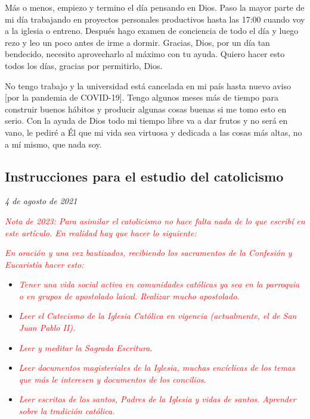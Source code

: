\documentclass[12pt]{article}
\begin{document}
Más o menos, empiezo y termino el día pensando en Dios. Paso la mayor parte de
mi día trabajando en proyectos personales productivos hasta las 17:00 cuando voy
a la iglesia o entreno. Después hago examen de conciencia de todo el día y
luego rezo y leo un poco antes de irme a dormir. Gracias, Dios, por un día tan
bendecido, necesito aprovecharlo al máximo con tu ayuda. Quiero hacer esto todos
los días, gracias por permitirlo, Dios.

No tengo trabajo y la universidad está cancelada en mi país hasta nuevo aviso
[por la pandemia de COVID-19]. Tengo algunos meses más de tiempo
 para construir buenos hábitos y producir algunas cosas buenas
si me tomo esto en serio. Con la ayuda de Dios todo mi tiempo libre va a dar
frutos y no será en vano, le pediré a Él que mi vida sea virtuosa y dedicada a
las cosas más altas, no a mí mismo, que nada soy.

\newpage
\subsection{Instrucciones para el estudio del catolicismo}

	\textit{4 de agosto de 2021}

\textcolor{red}{\textit{Nota de 2023: Para asimilar el catolicismo no hace falta
nada de lo que escribí en este artículo. En realidad hay que hacer lo
siguiente:}}

\textcolor{red}{\textit{En oración y una vez bautizados, recibiendo los
sacramentos de la Confesión y Eucaristía hacer esto:}}

\begin{itemize}
	\item \textcolor{red}{\textit{Tener una vida social activa en
		comunidades católicas ya sea en la parroquia o en grupos de
		apostolado laical. Realizar mucho apostolado.}}
	\item \textcolor{red}{\textit{Leer el Catecismo de la Iglesia Católica
		en vigencia (actualmente, el de San Juan Pablo II).}}
	\item \textcolor{red}{\textit{Leer y meditar la Sagrada Escritura.}}
	\item \textcolor{red}{\textit{Leer documentos magisteriales de la
		Iglesia, muchas encíclicas de los temas que más le interesen y
		documentos de los concilios.}}
	\item \textcolor{red}{\textit{Leer escritos de los santos, Padres de la
		Iglesia y vidas de santos. Aprender sobre la tradición
		católica.}}
\end{itemize}
\end{document}
